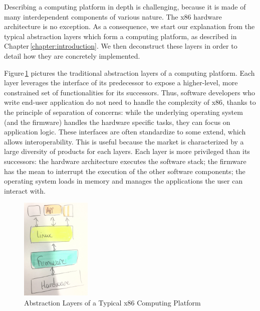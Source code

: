 Describing a computing platform in depth is challenging, because it is made of
many interdependent components of various nature.
%
The x86 hardware architecture is no exception.
%
As a consequence, we start our explanation from the typical abstraction layers
which form a computing platform, as described in
Chapter\,\ref{chapter:introduction}.
%
We then deconstruct these layers in order to detail how they are concretely
implemented.

Figure\,\ref{fig:usecase:computing-platform-1} pictures the traditional
abstraction layers of a computing platform.
%
Each layer leverages the interface of its predecessor to expose a higher-level,
more constrained set of functionalities for its successors.
%
Thus, software developers who write end-user application do not need to handle
the complexity of x86, thanks to the principle of separation of concerns: while
the underlying operating system (and the firmware) handles the hardware specific
tasks, they can focus on application logic.
%
These interfaces are often standardize to some extend, which allows
interoperability.
%
This is useful because the market is characterized by a large diversity of
products for each layers.
%
%
Each layer is more privileged than its successors:
%
the hardware architecture executes the software stack;
%
the firmware has the mean to interrupt the execution of the other software
components;
%
the operating system loads in memory and manages the applications the user can
interact with.

\begin{figure}
  \centering
  \includegraphics[width=0.3\textwidth]{Figures/computing-platform-1.jpg}
  \caption{Abstraction Layers of a Typical x86 Computing Platform}
  \label{fig:usecase:computing-platform-1}
\end{figure}

